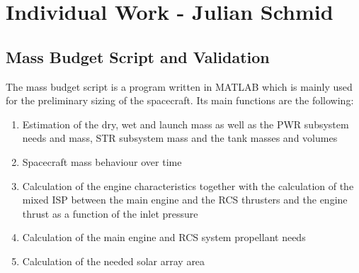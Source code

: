 \section{Individual Work - Julian Schmid}




\subsection{Mass Budget Script and Validation}

The mass budget script is a program written in MATLAB which is mainly used for the preliminary sizing of the spacecraft. Its main functions are the following: 

\begin{enumerate}

   \item Estimation of the dry, wet and launch mass as well as the PWR subsystem needs and mass, STR subsystem mass and the tank masses and volumes

   \item Spacecraft mass behaviour over time
   
   \item Calculation of the engine characteristics together with the calculation of the mixed ISP between the main engine and the RCS thrusters and the engine thrust as a function of the inlet pressure
   
   \item Calculation of the main engine and RCS system propellant needs
   
   \item Calculation of the needed solar array area

\end{enumerate}

